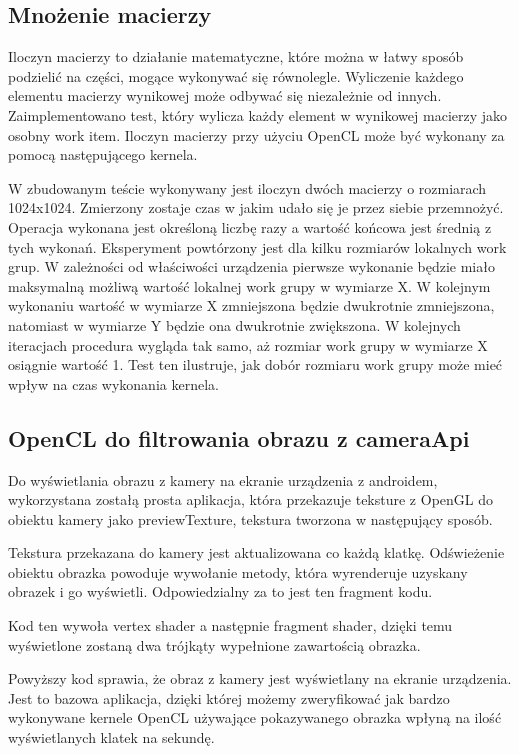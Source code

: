 \subsection[Mnożenie macierzy]{Mnożenie macierzy}
Iloczyn macierzy to działanie matematyczne, które można w łatwy sposób podzielić na części, mogące wykonywać się równolegle. Wyliczenie każdego elementu macierzy wynikowej może odbywać się niezależnie od innych. Zaimplementowano test, który wylicza każdy element w wynikowej macierzy jako osobny work item. Iloczyn macierzy przy użyciu OpenCL może być wykonany za pomocą następującego kernela.

W zbudowanym teście wykonywany jest iloczyn dwóch macierzy o rozmiarach 1024x1024. Zmierzony zostaje czas w jakim udało się je przez siebie przemnożyć. Operacja wykonana jest określoną liczbę razy a wartość końcowa jest średnią z tych wykonań. Eksperyment powtórzony jest dla kilku rozmiarów lokalnych work grup. W zależności od właściwości urządzenia pierwsze wykonanie będzie miało maksymalną możliwą wartość lokalnej work grupy w wymiarze X. W kolejnym wykonaniu wartość w wymiarze X zmniejszona będzie dwukrotnie zmniejszona, natomiast w wymiarze Y będzie ona dwukrotnie zwiększona. W kolejnych iteracjach procedura wygląda tak samo, aż rozmiar work grupy w wymiarze X osiągnie wartość 1. Test ten ilustruje, jak dobór rozmiaru work grupy może mieć wpływ na czas wykonania kernela.
\subsection[OpenCL do filtrowania obrazu z cameraApi]{OpenCL do filtrowania obrazu z cameraApi}
Do wyświetlania obrazu z kamery na ekranie urządzenia z androidem, wykorzystana zostałą prosta aplikacja, która przekazuje teksture z OpenGL do obiektu kamery jako previewTexture, tekstura tworzona w następujący sposób.

 Tekstura przekazana do kamery jest aktualizowana co każdą klatkę. Odświeżenie obiektu obrazka powoduje wywołanie metody, która wyrenderuje uzyskany obrazek i go wyświetli. Odpowiedzialny za to jest ten fragment kodu.
 

Kod ten wywoła vertex shader a następnie fragment shader, dzięki temu wyświetlone zostaną dwa trójkąty wypełnione zawartością obrazka.

Powyższy kod sprawia, że obraz z kamery jest wyświetlany na ekranie urządzenia. Jest to bazowa aplikacja, dzięki której możemy zweryfikować jak bardzo wykonywane kernele OpenCL używające pokazywanego obrazka wpłyną na ilość wyświetlanych klatek na sekundę.
